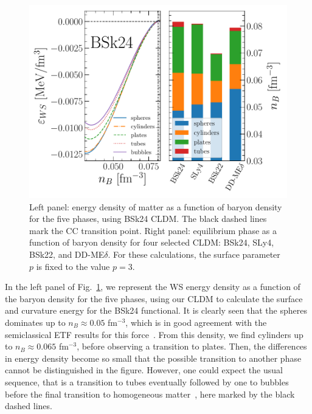 \begin{figure}[!t]
\begin{center}
  \includegraphics[width=0.9\linewidth]{figures/pasta.pdf}
\end{center}
\caption[Pasta phases in the inner crust]{Left panel: energy density of matter 
  as a function of baryon density for the five phases, using BSk24 
CLDM. The black dashed lines mark the CC transition point. Right panel: 
equilibrium phase as a function of baryon density for four
selected CLDM: BSk24, SLy4, BSk22, and DD-ME$\delta$. For these calculations,
the surface parameter $p$ is fixed to the value $p=3$.}\label{fig:pasta}
\end{figure}

In the left panel of Fig.~\ref{fig:pasta}, we represent the WS energy density
as a function of the baryon density for the five phases, using our CLDM to 
calculate the surface and curvature energy for the BSk24 functional. It is
clearly seen that the spheres dominates up to $n_B \approx 0.05$ fm$^{-3}$,
which is in good agreement with the semiclassical ETF results for this
force~\cite{Pearson2020}. From this density, we find cylinders up to $n_B
\approx 0.065$ fm$^{-3}$, before observing a transition to plates. Then, the
differences in energy density become so small that the possible transition to 
another phase cannot be distinguished in the figure. However, one could expect
the usual sequence, that is a transition to tubes eventually followed by one to 
bubbles before the final transition to homogeneous
matter~\cite{Ravenhall1983}, here marked by the black dashed lines.

